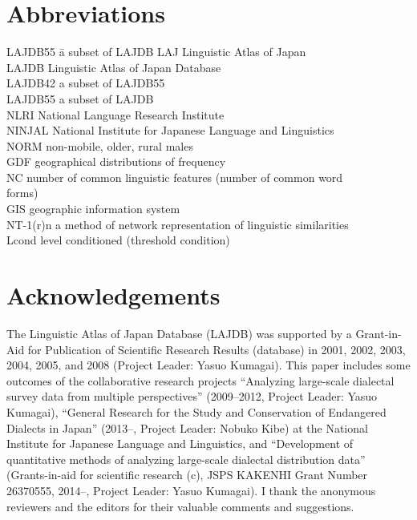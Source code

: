\documentclass[output=paper]{LSP/langsci}
\begin{document}
\section*{Abbreviations}
\setlength{\parindent}{0pt}\begin{tabbing}
LAJDB55\hspace{.75em} \= a subset of LAJDB\kill
LAJ	\> Linguistic Atlas of Japan\\
LAJDB \>	Linguistic Atlas of Japan Database\\
LAJDB42	\> a subset of LAJDB55\\
LAJDB55 \> a subset of LAJDB\\
NLRI	\> National Language Research Institute\\
NINJAL	\> National Institute for Japanese Language and Linguistics\\
NORM	\> non-mobile, older, rural males\\
GDF	\> geographical distributions of frequency\\
NC \> number of common linguistic features (number of common word\\
	\> forms)\\
GIS	\> geographic information system\\
NT-1(r)n	\> a method of network representation of linguistic similarities\\
Lcond	\> level conditioned (threshold condition)
\end{tabbing}\setlength{\parindent}{10pt}

\section*{Acknowledgements}
The Linguistic Atlas of Japan Database (LAJDB) was supported by a Grant-in-Aid for Publication of Scientific Research Results (database) in 2001, 2002, 2003, 2004, 2005, and 2008 (Project Leader: Yasuo Kumagai). This paper includes some outcomes of the collaborative research projects “Analyzing large-scale dialectal survey data from multiple perspectives” (2009–2012, Project Leader: Yasuo Kumagai), “General Research for the Study and Conservation of Endangered Dialects in Japan” (2013–, Project Leader: Nobuko Kibe) at the National Institute for Japanese Language and Linguistics, and “Development of quantitative methods of analyzing large-scale dialectal distribution data” (Grants-in-aid for scientific research (c), JSPS KAKENHI Grant Number 26370555, 2014–, Project Leader: Yasuo Kumagai). I thank the anonymous reviewers and the editors for their valuable comments and suggestions.

\printbibliography[heading=subbibliography,notkeyword=this]
\end{document}
